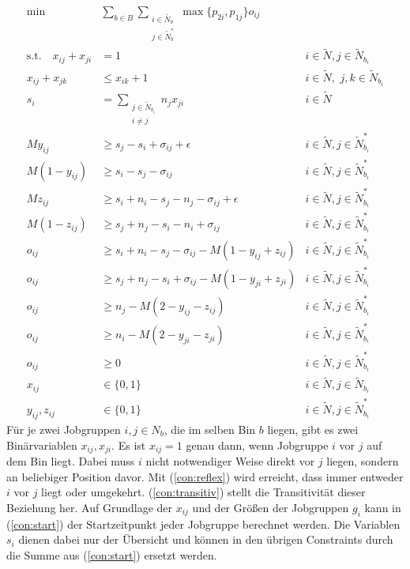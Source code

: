 \documentclass{scrreprt}
\begin{document}
\begin{align}
    \text{min}\quad &\sum_{b\in B}\sum_{\substack{i\in \tilde{N_b}\\j\in \tilde{N}_b^*}} 
            \max\{p_{2i},p_{1j}\}o_{ij} \label{objfunc}\\
			\text{s.t.} \quad x_{ij} + x_{ji} &= 1 &i\in \tilde{N}, j\in \tilde{N}_{b_i} \label{con:reflex}\\
			x_{ij} + x_{jk} &\leq x_{ik} + 1 &i\in \tilde{N},\,\, j,k\in \tilde{N}_{b_i} \label{con:transitiv} \\
			s_i &= \sum_{\substack{j\in \tilde{N}_{b_i}\\i\neq j}} n_j x_{ji} &i\in \tilde{N} \label{con:start} \\
            My_{ij} &\geq s_j - s_i + \sigma_{ij} + \epsilon &i\in \tilde{N}, j\in \tilde{N}^*_{b_i} \label{con:y1} \\
            M(1-y_{ij}) &\geq s_i - s_j - \sigma_{ij} &i\in \tilde{N}, j\in \tilde{N}^*_{b_i} \label{con:y2} \\
            Mz_{ij} &\geq s_i + n_i - s_j - n_j - \sigma_{ij} + \epsilon &i\in \tilde{N}, j\in \tilde{N}^*_{b_i} \label{con:z1} \\
            M(1-z_{ij}) &\geq s_j + n_j- s_i - n_i + \sigma_{ij} &i\in \tilde{N}, j\in \tilde{N}^*_{b_i} \label{con:z2} \\
            o_{ij} &\geq s_i + n_i - s_j - \sigma_{ij} - M(1-y_{ij}+z_{ij}) &i\in \tilde{N}, j\in \tilde{N}^*_{b_i} \label{con:o1} \\
            o_{ij} &\geq s_j + n_j - s_i + \sigma_{ij} - M(1-y_{ji}+z_{ji}) &i\in \tilde{N}, j\in \tilde{N}^*_{b_i} \label{con:o2} \\
            o_{ij} &\geq n_j - M(2-y_{ij}-z_{ij}) &i\in \tilde{N}, j\in \tilde{N}^*_{b_i} \label{con:o3} \\
            o_{ij} &\geq n_i - M(2-y_{ji}-z_{ji}) &i\in \tilde{N}, j\in \tilde{N}^*_{b_i} \label{con:o4} \\
            o_{ij} &\geq 0 &i\in \tilde{N}, j\in \tilde{N}^*_{b_i} \label{con:o5} \\
            x_{ij} &\in \{0,1\} &i\in \tilde{N}, j\in \tilde{N}_{b_i} \\
            y_{ij},z_{ij} &\in \{0,1\} &i\in \tilde{N}, j\in \tilde{N}^*_{b_i}
\end{align}
Für je zwei Jobgruppen $i,j\in N_b$, die im selben Bin $b$ liegen, gibt es
zwei Binärvariablen $x_{ij},x_{ji}$. Es ist $x_{ij}=1$ genau dann, wenn 
Jobgruppe $i$ vor $j$ auf dem Bin liegt. Dabei muss $i$ nicht notwendiger
Weise direkt vor $j$ liegen, sondern an beliebiger Position davor.
Mit (\ref{con:reflex}) wird erreicht, dass immer entweder $i$ vor $j$ liegt
oder umgekehrt. (\ref{con:transitiv}) stellt die Transitivität dieser Beziehung
her. Auf Grundlage der $x_{ij}$ und der Größen der Jobgruppen $g_i$ 
kann in (\ref{con:start}) der Startzeitpunkt jeder Jobgruppe berechnet werden.
Die Variablen $s_i$ dienen dabei nur der Übersicht und können in den übrigen 
Constraints durch die Summe aus (\ref{con:start}) ersetzt werden.
\end{document}
